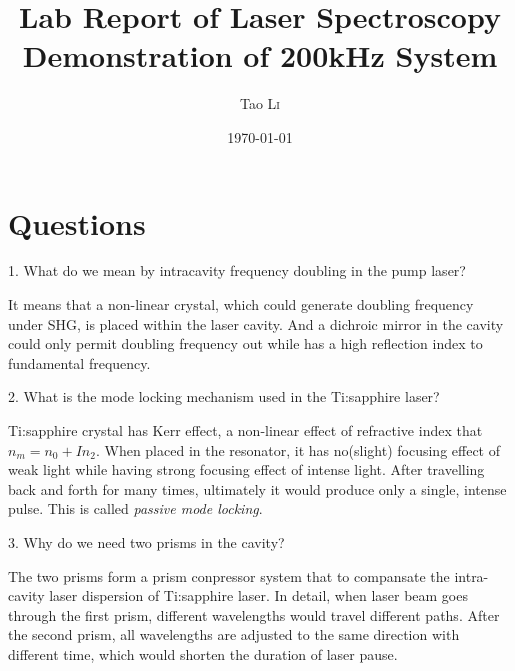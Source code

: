 \documentclass{article}
\title{Lab Report of Laser Spectroscopy \\ Demonstration of 200kHz System} %
\author{Tao \textsc{Li}} %
\date{\today} %
\begin{document}
\maketitle %



\section{Questions}
1. What do we mean by intracavity frequency doubling in the pump laser?\par
It means that a non-linear crystal, which could generate doubling frequency under SHG, is placed within the laser cavity. And a dichroic mirror in the cavity could only permit doubling frequency out while has a high reflection index to fundamental frequency.\\
\par
2. What is the mode locking mechanism used in the Ti:sapphire laser?\par
Ti:sapphire crystal has Kerr effect, a non-linear effect of refractive index that $n_m=n_0+In_2$. When placed in the resonator, it has no(slight) focusing effect of weak light while having strong focusing effect of intense light. After travelling back and forth for many times, ultimately it would produce only a single, intense pulse. This is called \textit{passive mode locking}.   \\
\par 
3. Why do we need two prisms in the cavity?\par 
The two prisms form a prism conpressor system that to compansate the intra-cavity laser dispersion of Ti:sapphire laser. In detail, when laser beam goes through the first prism, different wavelengths would travel different paths. After the second prism, all wavelengths are adjusted to the same direction with different time, which would shorten the duration of laser pause.\\
\par 
\end{document}
